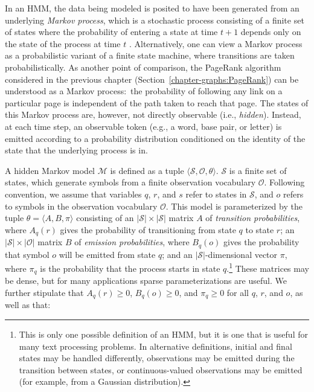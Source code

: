 In an HMM, the data being modeled is posited to have been generated
from an underlying \emph{Markov process}, which is a stochastic
process consisting of a finite set of states where the probability of
entering a state at time $t+1$ depends only on the state of the
process at time $t$ \cite{Ross_1996}.  Alternatively, one can view a
Markov process as a probabilistic variant of a finite state machine,
where transitions are taken probabilistically.  As another point of
comparison, the PageRank algorithm considered in the previous chapter
(Section~\ref{chapter-graphs:PageRank}) can be understood as a Markov
process:\ the probability of following any link on a particular page
is independent of the path taken to reach that page.  The states of
this Markov process are, however, not directly observable (i.e., \emph{
  hidden}).  Instead, at each time step, an observable token (e.g., a
word, base pair, or letter) is emitted according to a probability
distribution conditioned on the identity of the state that the
underlying process is in.

A hidden Markov model $\mathcal{M}$ is defined as a tuple $\langle
\mathcal{S} , \mathcal{O}, \theta \rangle$.  $\mathcal{S}$ is a finite
set of states, which generate symbols from a finite observation
vocabulary $\mathcal{O}$.  Following convention, we assume that
variables $q$, $r$, and $s$ refer to states in $\mathcal{S}$, and $o$
refers to symbols in the observation vocabulary $\mathcal{O}$. This
model is parameterized by the tuple $\theta=\langle A, B, \pi \rangle$
consisting of an $|\mathcal{S}| \times |\mathcal{S}|$ matrix $A$ of
\emph{transition probabilities}, where $A_{q}(r)$ gives the
probability of transitioning from state $q$ to state $r$; an
$|\mathcal{S}| \times |\mathcal{O}|$ matrix $B$ of \emph{emission
  probabilities}, where $B_{q}(o)$ gives the probability that symbol
$o$ will be emitted from state $q$; and an $|\mathcal{S}|$-dimensional
vector $\pi$, where $\pi_q$ is the probability that the process starts
in state $q$.\footnote{This is only one possible definition of an HMM,
  but it is one that is useful for many text processing problems.  In
  alternative definitions, initial and final states may be handled
  differently, observations may be emitted during the transition
  between states, or continuous-valued observations may be emitted
  (for example, from a Gaussian distribution).}  These matrices may be
dense, but for many applications sparse parameterizations are useful.
We further stipulate that $A_{q}(r) \ge 0$, $B_q(o) \ge 0$, and $\pi_q
\ge 0$ for all $q$, $r$, and $o$, as well as that:

